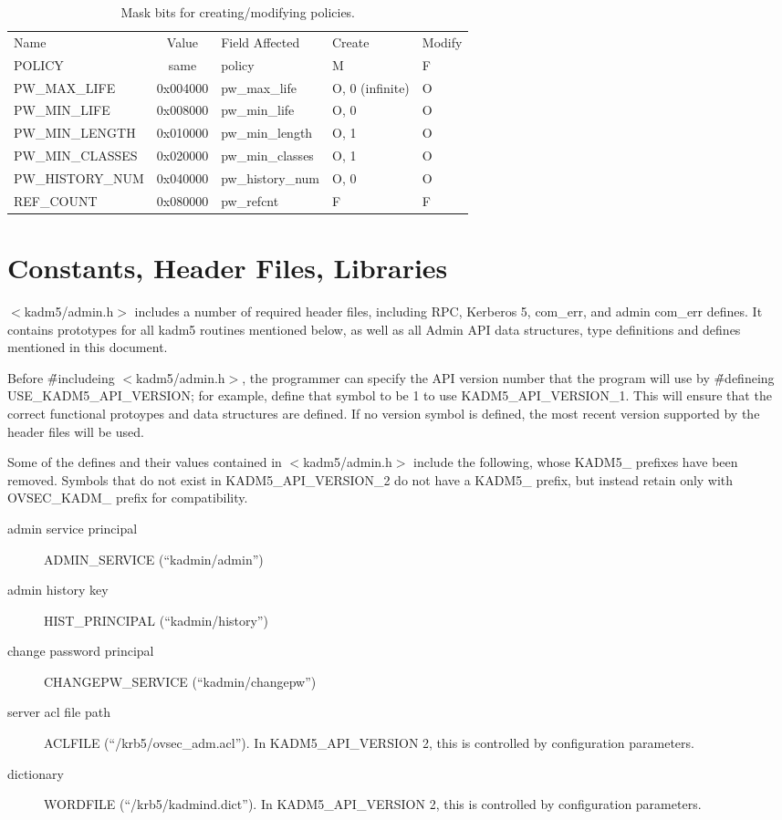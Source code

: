 \begin{table}[htbp]
\begin{tabular}{@{}lclll}
Name & Value & Field Affected & Create & Modify \\
POLICY                  & same     & policy & M & F \\
PW_MAX_LIFE             & 0x004000 & pw_max_life & O, 0 (infinite) & O \\
PW_MIN_LIFE             & 0x008000 & pw_min_life & O, 0 & O \\
PW_MIN_LENGTH           & 0x010000 & pw_min_length & O, 1 & O \\
PW_MIN_CLASSES          & 0x020000 & pw_min_classes & O, 1 & O \\
PW_HISTORY_NUM          & 0x040000 & pw_history_num & O, 0 & O \\
REF_COUNT               & 0x080000 & pw_refcnt & F & F
\end{tabular}
\caption{Mask bits for creating/modifying policies.}
\label{tab:policy-bits}
\end{table}

\section{Constants, Header Files, Libraries}

$<$kadm5/admin.h$>$ includes a number of required header files,
including RPC, Kerberos 5, com_err, and admin com_err
defines.  It contains prototypes for all kadm5 routines mentioned
below, as well as all Admin API data structures, type definitions and
defines mentioned in this document.  

Before \v{\#include}ing $<$kadm5/admin.h$>$, the programmer can
specify the API version number that the program will use by
\v{\#define}ing USE_KADM5_API_VERSION; for example, define that symbol
to be 1 to use KADM5_API_VERSION_1.  This will ensure that the correct
functional protoypes and data structures are defined.  If no version
symbol is defined, the most recent version supported by the header
files will be used.

Some of the defines and their values contained in $<$kadm5/admin.h$>$
include the following, whose KADM5_ prefixes have been removed.
Symbols that do not exist in KADM5_API_VERSION_2 do not have a KADM5_
prefix, but instead retain only with OVSEC_KADM_ prefix for
compatibility.
\begin{description}
\item[admin service principal] ADMIN_SERVICE (``kadmin/admin'')
\item[admin history key] HIST_PRINCIPAL (``kadmin/history'')
\item[change password principal] CHANGEPW_SERVICE (``kadmin/changepw'')
\item[server acl file path] ACLFILE (``/krb5/ovsec_adm.acl'').  In
KADM5_API_VERSION 2, this is controlled by configuration parameters.
\item[dictionary] WORDFILE (``/krb5/kadmind.dict'').    In
KADM5_API_VERSION 2, this is controlled by configuration parameters.
\end{description}

